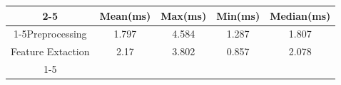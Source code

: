 \documentclass{standalone}
\begin{document}
 
 \begin{tabular}{|c |c |c |c |c |}
\cline{2-5}\cline{2-5} \multicolumn{1}{c |}{ } & Mean(ms) & Max(ms) & Min(ms) & Median(ms)\\ 
\cline{1-5}Preprocessing & 1.797 & 4.584 & 1.287 & 1.807\\ 
 \hhline{|=|=|=|=|=|}Feature Extaction & 2.17 & 3.802 & 0.857 & 2.078\\ 
 \cline{1-5}\hline \end{tabular}
 
\end{document}
